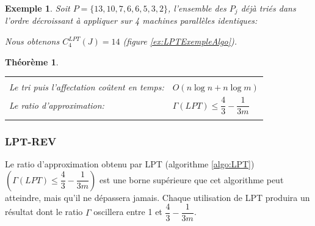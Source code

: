 \documentclass[a4paper,12pt]{report}
\theoremstyle{plain}				%
\newtheorem{theoreme}{Théorème}	%
\newtheorem{example}{Exemple}
\theoremstyle{definition}				%
\newcommand{\tdi}[1]{\todo[inline]{{#1}}{}}
\newcommand{\lcc}[1]{\todo[author=LCC,color=green,inline]{#1}}
\begin{document}
\begin{example}
Soit $P=\{13,10,7,6,6,5,3,2\}$, l'ensemble des $P_j$ déjà triés dans
l'ordre décroissant à appliquer sur 4 machines parallèles identiques:

Nous obtenons $C_4^{LPT}(J)=14$ (figure \ref{ex:LPTExempleAlgo}).
\end{example}

\begin{theoreme}
\begin{flushleft}
\begin{tabular}{|p{8cm}p{6cm}|}
\hline
& \\
Le tri puis l'affectation coûtent en temps:& $O(n \log n + n \log m)$
\\	%
Le ratio d'approximation:	&	$\Gamma(LPT)\leq \dfrac{4}{3} - \dfrac{1}{3m}$
\\
& \\
\hline
\end{tabular}
\end{flushleft}
\end{theoreme}


\subsubsection{LPT-REV} %

Le ratio d'approximation obtenu par LPT (algorithme \ref{algo:LPT})
$(\Gamma(LPT)\leq \dfrac{4}{3} - \dfrac{1}{3m})$ est une borne
supérieure que cet algorithme peut atteindre, mais qu'il ne dépassera
jamais.
Chaque utilisation de LPT produira un résultat dont le ratio $\Gamma$
oscillera entre 1 et $\dfrac{4}{3} - \dfrac{1}{3m}$.
\bigskip
\end{document}
